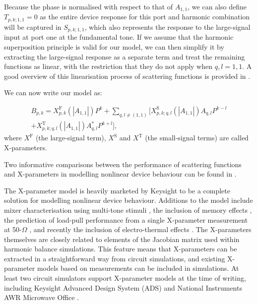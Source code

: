 \documentclass[../thesis/thesis.tex]{subfiles}
\begin{document}
Because the phase is normalised with respect to that of $A_{1, 1}$, we can also define $T_{p,k;1,1}=0$ as the entire device response for this port and harmonic combination will be captured in $S_{p,k;1,1}$, which also represents the response to the large-signal input at port one at the fundamental tone. If we assume that the harmonic superposition principle is valid for our model, we can then simplify it by extracting the large-signal response as a separate term and treat the remaining functions as linear, with the restriction that they do not apply when $q, l = 1, 1$. A good overview of this linearisation process of scattering functions is provided in \cite{Verspecht_2005b}.

We can now write our model as:

\begin{equation}
\begin{split}
B_{p, k}=X^\textrm{F}_{p, k}(|A_{1, 1}|)P^k+\sum_{q, l\ne(1,1)}[X^\textrm{S}_{p, k;q, l}(|A_{1, 1}|)A_{q, l}P^{k-l}\\+X^\textrm{T}_{p, k;q, l}(|A_{1, 1}|)A^*_{q, l}P^{k+l}],
\end{split}
\label{ch5_eqn_xps}
\end{equation}
where $X^\textrm{F}$ (the large-signal term), $X^\textrm{S}$ and $X^\textrm{T}$ (the small-signal terms) are called X-parameters.

Two informative comparisons between the performance of scattering functions and X-parameters in modelling nonlinear device behaviour can be found in \cite{Sun_2010,Widemann_2015}.

The X-parameter model is heavily marketed by Keysight to be a complete solution for modelling nonlinear device behaviour. Additions to the model include mixer characterisation using multi-tone stimuli \cite{Xie_2012}, the inclusion of memory effects \cite{Verspecht_2009}, the prediction of load-pull performance from a single X-parameter measurement at 50-$\Omega$ \cite{Root_2017}, and recently the inclusion of electro-thermal effects \cite{Gillespie_2018}. The X-parameters themselves are closely related to elements of the Jacobian matrix used within harmonic balance simulations. This feature means that X-parameters can be extracted in a straightforward way from circuit simulations, and existing X-parameter models based on measurements can be included in simulations. At least two circuit simulators support X-parameter models at the time of writing, including Keysight Advanced Design System (ADS) \cite{ADS} and National Instruments AWR Microwave Office \cite{AWR}.
\end{document}
